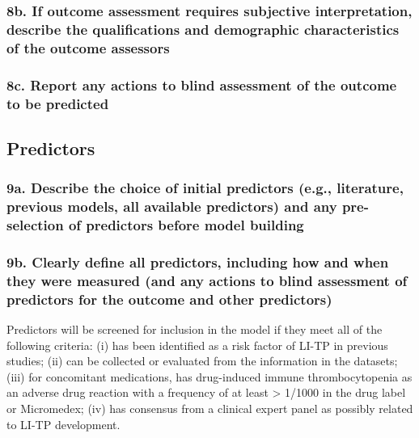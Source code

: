 \documentclass[
  letterpaper,
  DIV=11,
  numbers=noendperiod]{scrartcl}
\begin{document}
\subsubsection{8b. If outcome assessment requires subjective
interpretation, describe the qualifications and demographic
characteristics of the outcome
assessors}\label{b.-if-outcome-assessment-requires-subjective-interpretation-describe-the-qualifications-and-demographic-characteristics-of-the-outcome-assessors}

\subsubsection{8c. Report any actions to blind assessment of the outcome
to be
predicted}\label{c.-report-any-actions-to-blind-assessment-of-the-outcome-to-be-predicted}

\subsection{Predictors}\label{predictors}

\subsubsection{9a. Describe the choice of initial predictors (e.g.,
literature, previous models, all available predictors) and any
pre-selection of predictors before model
building}\label{a.-describe-the-choice-of-initial-predictors-e.g.-literature-previous-models-all-available-predictors-and-any-pre-selection-of-predictors-before-model-building}

\subsubsection{9b. Clearly define all predictors, including how and when
they were measured (and any actions to blind assessment of predictors
for the outcome and other
predictors)}\label{b.-clearly-define-all-predictors-including-how-and-when-they-were-measured-and-any-actions-to-blind-assessment-of-predictors-for-the-outcome-and-other-predictors}

Predictors will be screened for inclusion in the model if they meet all
of the following criteria: (i) has been identified as a risk factor of
LI-TP in previous studies; (ii) can be collected or evaluated from the
information in the datasets; (iii) for concomitant medications, has
drug-induced immune thrombocytopenia as an adverse drug reaction with a
frequency of at least \textgreater{} 1/1000 in the drug label or
Micromedex; (iv) has consensus from a clinical expert panel as possibly
related to LI-TP development.
\end{document}
